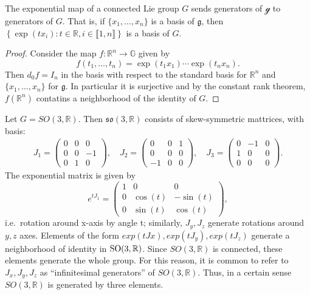 \documentclass{report}
\begin{document}
\begin{lemma}
    The exponential map of a connected Lie group $G$ sends generators of $\mathcal g$ to generators of $G$.
    That is, if $\{ x_1, \ldots, x_n \}$ is a basis of $\mathfrak g$, then $\left\{ \exp(t x_i) : t \in \mathbb R, i \in \llbracket 1, n \rrbracket \right\}$ is a basis of $G$.
\end{lemma}
\begin{proof}
    Consider the map $f: \mathbb R^n \to \mathbb G$ given by
    \[
    f(t_1, \ldots, t_n) = \exp(t_1 x_1) \cdots \exp(t_n x_n).
    \]
    Then $d_0 f = I_n$ in the basis with respect to the standard basis for $\mathbb R^n$ and $\{ x_1, \ldots, x_n \}$ for $\mathfrak g$.
    In particular it is surjective and by the constant rank theorem, $f(\mathbb R^n)$ contatins a neighborhood of the identity of $G$. 
\end{proof}
\begin{example}
    Let $G = SO(3, \mathbb R)$.
    Then $\mathfrak{so}(3, \mathbb R)$ consists of skew-symmetric mattrices, with basis:
    \begin{align*}
        J_1 = \begin{pmatrix} 0 & 0 & 0 \\ 0 & 0 & -1 \\ 0 & 1 & 0 \end{pmatrix}, \quad
        J_2 = \begin{pmatrix} 0 & 0 & 1 \\ 0 & 0 & 0 \\ -1 & 0 & 0 \end{pmatrix}, \quad
        J_3 = \begin{pmatrix} 0 & -1 & 0 \\ 1 & 0 & 0 \\ 0 & 0 & 0 \end{pmatrix}.
    \end{align*}
    The exponential matrix is given by
    \[
    e^{tJ_1} = 
    \begin{pmatrix}
        1 & 0 & 0 \\
        0 & \cos(t) & -\sin(t) \\
        0 & \sin(t) & \cos(t)
    \end{pmatrix},
    \]
    i.e.\ rotation around x-axis by angle t; similarly, $J_y, J_z$ generate rotations around
    $y, z$ axes.
    Elements of the form $exp(tJx), exp(tJ_y ), exp(tJ_z )$ generate
    a neighborhood of identity in $\operatorname{{\mathrm{SO}}}(3, \mathbb R)$.
    Since $SO(3, \mathbb R)$ is connected, these elements generate the whole group. 
    For this reason, it is common to refer to $J_x , J_y , J_z$ as “inﬁnitesimal generators” of $SO(3, \mathbb R)$. Thus,
    in a certain sense $SO(3, \mathbb R)$ is generated by three elements.
\end{example}
\end{document}
